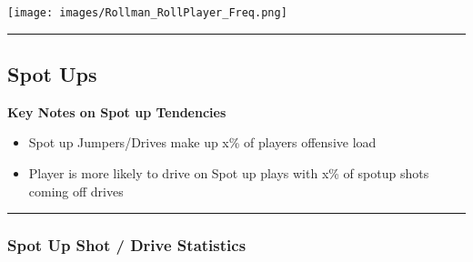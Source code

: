 \documentclass[a4paper,12pt]{article}
\begin{document}
\begin{table}[H]
{\begin{minipage}[t]{0.6\textwidth}
{\begin{tabular}
{{{{{{{{{{{{            \bottomrule
        \end{tabular}
        } %
    \end{minipage}
    } %
    \hfill %
    \begin{minipage}[c]{0.35\textwidth} %
        \flushright
        \texttt{[image: images/Rollman\_RollPlayer\_Freq.png]} %
    \end{minipage}
\end{table}

\vspace{-1em} %
\hrule height 1pt width 1\textwidth %
\vspace{1em} %

\clearpage

\subsection{Spot Ups}

\vspace{1.25em} %
\textbf{Key Notes on Spot up Tendencies}
\vspace{0.5em} %

\begin{itemize}
    \item Spot up Jumpers/Drives make up x\% of players offensive load
    \vspace{0.3em} %
    \item Player is more likely to drive on Spot up plays with x\% of spotup shots coming off drives
\end{itemize}

\vspace{1em} %
\hrule height 1pt width 1\textwidth %
\vspace{0em} %

\subsubsection{Spot Up Shot / Drive Statistics}
\end{document}
